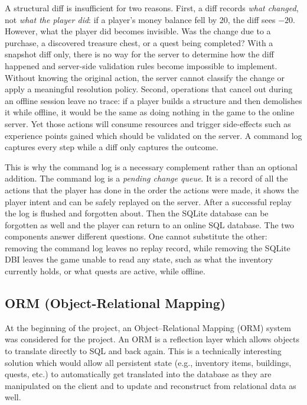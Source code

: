 \documentclass{article}
\begin{document}
A structural diff is insufficient for two reasons. First, a diff records \emph{what changed}, not \emph{what the player did}: if a player's money balance fell by 20, the diff sees $-20$. However, what the player did becomes invisible. Was the change due to a purchase, a discovered treasure chest, or a quest being completed? With a snapshot diff only, there is no way for the server to determine how the diff happened and server-side validation rules become impossible to implement. Without knowing the original action, the server cannot classify the change or apply a meaningful resolution policy. Second, operations that cancel out during an offline session leave no trace: if a player builds a structure and then demolishes it while offline, it would be the same as doing nothing in the game to the online server. Yet those actions will consume resources and trigger side-effects such as experience points gained which should be validated on the server. A command log captures every step while a diff only captures the outcome.

This is why the command log is a necessary complement rather than an optional addition. The command log is a \emph{pending change queue}. It is a record of all the actions that the player has done in the order the actions were made, it shows the player intent and can be safely replayed on the server. After a successful replay the log is flushed and forgotten about. Then the SQLite database can be forgotten as well and the player can return to an online SQL database. The two components answer different questions. One cannot substitute the other: removing the command log leaves no replay record, while removing the SQLite DBI leaves the game unable to read any state, such as what the inventory currently holds, or what quests are active, while offline.

\subsection{ORM (Object-Relational Mapping)}
\label{sec:ormimp}

At the beginning of the project, an Object–Relational Mapping (ORM) system was considered for the project. An ORM is a reflection layer which allows objects to translate directly to SQL and back again. This is a technically interesting solution which would allow all persistent state (e.g., inventory items, buildings, quests, etc.) to automatically get translated into the database as they are manipulated on the client and to update and reconstruct from relational data as well.
\end{document}
